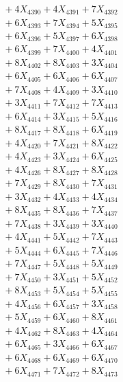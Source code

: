 \documentclass[a4paper,10pt]{article}
\begin{document}
{\begin{align}
&\;  + 4 X_{4390} + 4 X_{4391} + 7 X_{4392} \\[0.3ex]
&\;  + 6 X_{4393} + 7 X_{4394} + 5 X_{4395} \\[0.3ex]
&\;  + 6 X_{4396} + 5 X_{4397} + 6 X_{4398} \\[0.3ex]
&\;  + 6 X_{4399} + 7 X_{4400} + 4 X_{4401} \\[0.3ex]
&\;  + 8 X_{4402} + 8 X_{4403} + 3 X_{4404} \\[0.3ex]
&\;  + 6 X_{4405} + 6 X_{4406} + 6 X_{4407} \\[0.3ex]
&\;  + 7 X_{4408} + 4 X_{4409} + 3 X_{4410} \\[0.3ex]
&\;  + 3 X_{4411} + 7 X_{4412} + 7 X_{4413} \\[0.3ex]
&\;  + 6 X_{4414} + 3 X_{4415} + 5 X_{4416} \\[0.3ex]
&\;  + 8 X_{4417} + 8 X_{4418} + 6 X_{4419} \\[0.5ex]\allowbreak
&\;  + 4 X_{4420} + 7 X_{4421} + 8 X_{4422} \\[0.3ex]
&\;  + 4 X_{4423} + 3 X_{4424} + 6 X_{4425} \\[0.3ex]
&\;  + 4 X_{4426} + 8 X_{4427} + 8 X_{4428} \\[0.3ex]
&\;  + 7 X_{4429} + 8 X_{4430} + 7 X_{4431} \\[0.3ex]
&\;  + 3 X_{4432} + 4 X_{4433} + 4 X_{4434} \\[0.3ex]
&\;  + 8 X_{4435} + 8 X_{4436} + 7 X_{4437} \\[0.3ex]
&\;  + 7 X_{4438} + 3 X_{4439} + 3 X_{4440} \\[0.3ex]
&\;  + 4 X_{4441} + 5 X_{4442} + 7 X_{4443} \\[0.3ex]
&\;  + 5 X_{4444} + 6 X_{4445} + 7 X_{4446} \\[0.3ex]
&\;  + 7 X_{4447} + 5 X_{4448} + 5 X_{4449} \\[0.5ex]\allowbreak
&\;  + 7 X_{4450} + 3 X_{4451} + 5 X_{4452} \\[0.3ex]
&\;  + 8 X_{4453} + 5 X_{4454} + 5 X_{4455} \\[0.3ex]
&\;  + 4 X_{4456} + 6 X_{4457} + 3 X_{4458} \\[0.3ex]
&\;  + 5 X_{4459} + 6 X_{4460} + 8 X_{4461} \\[0.3ex]
&\;  + 4 X_{4462} + 8 X_{4463} + 4 X_{4464} \\[0.3ex]
&\;  + 6 X_{4465} + 3 X_{4466} + 6 X_{4467} \\[0.3ex]
&\;  + 6 X_{4468} + 6 X_{4469} + 6 X_{4470} \\[0.3ex]
&\;  + 6 X_{4471} + 7 X_{4472} + 8 X_{4473} \\[0.3ex]

\end{align}}
\end{document}
